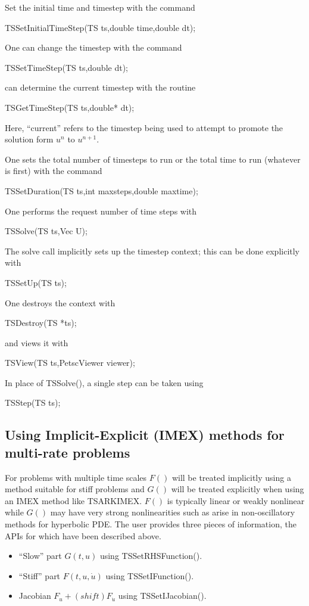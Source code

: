 \noindent Set the initial time and timestep with the command
\begin{tabbing}
 TSSetInitialTimeStep(TS ts,double time,double dt);
\end{tabbing}
One can change the timestep with the command
\begin{tabbing}
 TSSetTimeStep(TS ts,double dt);
\end{tabbing}
can determine the current timestep with the routine
\begin{tabbing}
 TSGetTimeStep(TS ts,double* dt);
\end{tabbing}
Here, ``current'' refers to the timestep being used to attempt to
promote the solution form $ u^n $ to $ u^{n+1}. $

\noindent One sets the total number of timesteps to run or the total time to run
(whatever is first) with the command
\begin{tabbing}
 TSSetDuration(TS ts,int maxsteps,double maxtime);
\end{tabbing}
One performs the request number of time steps with
\begin{tabbing}
  TSSolve(TS ts,Vec U);
\end{tabbing}
The solve call implicitly sets up the timestep context;
this can be done explicitly with
\begin{tabbing}
 TSSetUp(TS ts);
\end{tabbing}
One destroys the context with
\begin{tabbing}
 TSDestroy(TS *ts);
\end{tabbing}
and views it with
\begin{tabbing}
 TSView(TS ts,PetscViewer viewer);
\end{tabbing}
In place of TSSolve(), a single step can be taken using
\begin{tabbing}
TSStep(TS ts);
\end{tabbing}

\subsection{Using Implicit-Explicit (IMEX) methods for multi-rate problems}
\label{sec_imex}
For problems with multiple time scales
$F()$ will be treated implicitly using a method suitable for stiff problems and $G()$ will be treated explicitly when using an IMEX method like TSARKIMEX.
$F()$ is typically linear or weakly nonlinear while $G()$ may have very strong nonlinearities such as arise in non-oscillatory methods for hyperbolic PDE.
The user provides three pieces of information, the APIs for which have been described above.
\begin{itemize}
\item ``Slow'' part $G(t,u)$ using TSSetRHSFunction().
\item ``Stiff'' part $F(t,u,\dot u)$ using TSSetIFunction().
\item Jacobian $F_u + (shift) F_{\dot u}$ using TSSetIJacobian().
\end{itemize}

